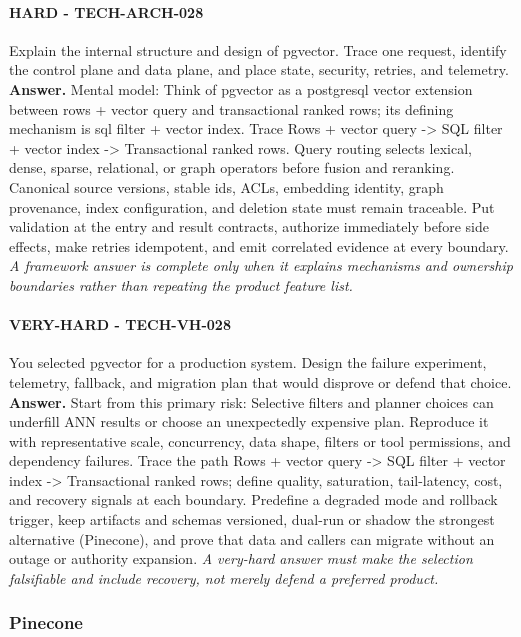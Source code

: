 \paragraph{HARD - TECH-ARCH-028} Explain the internal structure and design of pgvector. Trace one request, identify the control plane and data plane, and place state, security, retries, and telemetry.
\textbf{Answer.} Mental model: Think of pgvector as a postgresql vector extension between rows + vector query and transactional ranked rows; its defining mechanism is sql filter + vector index. Trace Rows + vector query -> SQL filter + vector index -> Transactional ranked rows. Query routing selects lexical, dense, sparse, relational, or graph operators before fusion and reranking. Canonical source versions, stable ids, ACLs, embedding identity, graph provenance, index configuration, and deletion state must remain traceable. Put validation at the entry and result contracts, authorize immediately before side effects, make retries idempotent, and emit correlated evidence at every boundary.
\textit{A framework answer is complete only when it explains mechanisms and ownership boundaries rather than repeating the product feature list.}
\paragraph{VERY-HARD - TECH-VH-028} You selected pgvector for a production system. Design the failure experiment, telemetry, fallback, and migration plan that would disprove or defend that choice.
\textbf{Answer.} Start from this primary risk: Selective filters and planner choices can underfill ANN results or choose an unexpectedly expensive plan. Reproduce it with representative scale, concurrency, data shape, filters or tool permissions, and dependency failures. Trace the path Rows + vector query -> SQL filter + vector index -> Transactional ranked rows; define quality, saturation, tail-latency, cost, and recovery signals at each boundary. Predefine a degraded mode and rollback trigger, keep artifacts and schemas versioned, dual-run or shadow the strongest alternative (Pinecone), and prove that data and callers can migrate without an outage or authority expansion.
\textit{A very-hard answer must make the selection falsifiable and include recovery, not merely defend a preferred product.}
\subsubsection*{Pinecone}
